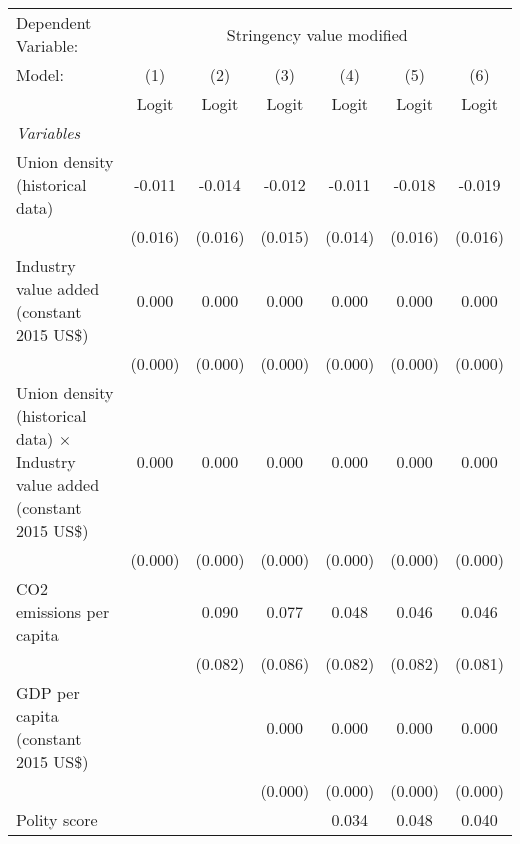 
\begingroup
\centering
\begin{tabular}{lcccccc}
   \toprule
   Dependent Variable: & \multicolumn{6}{c}{Stringency value modified}\\
   Model:                                                                               & (1)     & (2)     & (3)     & (4)     & (5)     & (6)\\  
                                                                                        &  Logit  & Logit   & Logit   & Logit   & Logit   & Logit\\  
   \midrule
   \emph{Variables}\\
   Union density (historical data)                                                      & -0.011  & -0.014  & -0.012  & -0.011  & -0.018  & -0.019\\   
                                                                                        & (0.016) & (0.016) & (0.015) & (0.014) & (0.016) & (0.016)\\   
   Industry value added (constant 2015 US\$)                                            & 0.000   & 0.000   & 0.000   & 0.000   & 0.000   & 0.000\\   
                                                                                        & (0.000) & (0.000) & (0.000) & (0.000) & (0.000) & (0.000)\\   
   Union density (historical data) $\times$ Industry value added (constant 2015 US\$)   & 0.000   & 0.000   & 0.000   & 0.000   & 0.000   & 0.000\\   
                                                                                        & (0.000) & (0.000) & (0.000) & (0.000) & (0.000) & (0.000)\\   
   CO2 emissions per capita                                                             &         & 0.090   & 0.077   & 0.048   & 0.046   & 0.046\\   
                                                                                        &         & (0.082) & (0.086) & (0.082) & (0.082) & (0.081)\\   
   GDP per capita (constant 2015 US\$)                                                  &         &         & 0.000   & 0.000   & 0.000   & 0.000\\   
                                                                                        &         &         & (0.000) & (0.000) & (0.000) & (0.000)\\   
   Polity score                                                                         &         &         &         & 0.034   & 0.048   & 0.040\\   

\end{tabular}
